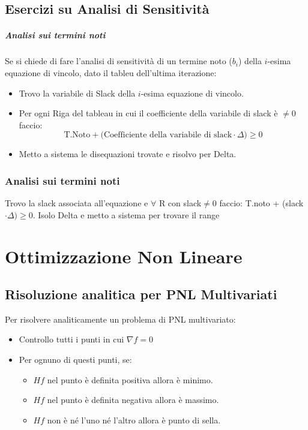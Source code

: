 \documentclass[12pt, a4paper, openany]{book}
\begin{document}
\section{Esercizi su Analisi di Sensitività}
\paragraph{Analisi sui termini noti}
Se si chiede di fare l'analisi di sensitività di un termine noto ($b_i$) della $i$-esima equazione di vincolo, dato il tableu dell'ultima iterazione:
\begin{itemize}
	\item Trovo la variabile di Slack della $i$-esima equazione di vincolo.
	\item Per ogni Riga del tableau in cui il coefficiente della variabile di slack è $\neq 0$ faccio:
	\[\text{T.Noto} + \text{(Coefficiente della variabile di slack} \cdot \Delta ) \geq 0\]
	\item Metto a sistema le disequazioni trovate e risolvo per Delta.
\end{itemize}


\subsection{Analisi sui termini noti}
Trovo la slack associata all'equazione e $\forall$ R con slack$\neq 0$ faccio: T.noto + (slack $\cdot \Delta) \geq 0$.
Isolo Delta e metto a sistema per trovare il range
\chapter{Ottimizzazione Non Lineare}

\section{Risoluzione analitica per PNL Multivariati}
Per risolvere analiticamente un problema di PNL multivariato:
\begin{itemize}
	\item Controllo tutti i punti in cui $\nabla f = 0$
	\item Per ognuno di questi punti, se:
	\begin{itemize}
		\item $Hf$ nel punto è definita positiva allora è minimo.
		\item $Hf$ nel punto è definita negativa allora è massimo.
		\item $Hf$ non è né l'uno né l'altro allora è punto di sella.
	\end{itemize}
\end{itemize}
\end{document}
